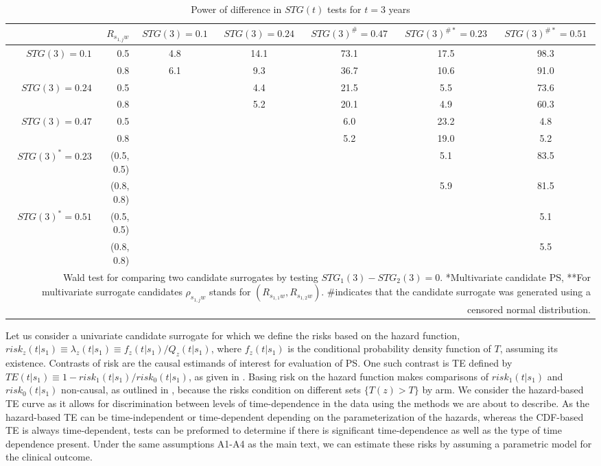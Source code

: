 \documentclass[times, 11pt]{article}
\begin{document}
\begin{table}
\begin{center}
\caption{Power of difference in $STG(t)$ tests for $t=3$ years \label{Power}}
\begin{tabular}{rrccccc}
  \hline
 & $R_{s_{1,j}w}$ & $STG(3)=0.1$  & $STG(3)=0.24$  & $STG(3)^{\#}=0.47$& $STG(3)^{\#*}=0.23$  & $STG(3)^{\#*}=0.51$\\
  \hline
$STG(3)=0.1$ &0.5 & 4.8 & 14.1 & 73.1 & 17.5 & 98.3 \\ 
   &0.8 &6.1 & 9.3 & 36.7 & 10.6 & 91.0 \\ 
$STG(3)=0.24$ &0.5&  & 4.4 & 21.5 & 5.5 & 73.6 \\ 
   &0.8 &  & 5.2 & 20.1 & 4.9 & 60.3 \\ 
$STG(3)=0.47$&0.5 &  &  & 6.0 & 23.2 & 4.8 \\ 
   &0.8&  &  & 5.2 & 19.0 & 5.2 \\ 
$STG(3)^{*}=0.23$&(0.5, 0.5) &  &  &  & 5.1 & 83.5 \\ 
   &(0.8, 0.8) &  &  &  & 5.9 & 81.5 \\ 
$STG(3)^{*}=0.51$&(0.5, 0.5)&   &  &  &  & 5.1 \\ 
   &(0.8, 0.8)&  &  &  &  & 5.5 \\ 
   \hline
\multicolumn{7}{p{9in}}{Wald test for comparing two candidate surrogates by testing $STG_1(3)-STG_2(3)=0$. *Multivariate candidate PS, **For multivariate surrogate candidates $\rho_{s_{1,j}w}$ stands for $(R_{s_{1,1}w},R_{s_{1,2}w})$. \#indicates that the candidate surrogate was generated using a censored normal distribution.}
\end{tabular}
\end{center}
\end{table}

Let us consider a univariate candidate surrogate for which we define the risks based on the hazard function, $risk_{z}(t|s_1)\equiv\lambda_z(t|s_1)\equiv{f_z(t|s_1)/Q_z(t|s_1)}$, where $f_z(t|s_1)$ is the conditional probability density function of $T$, assuming its existence. Contrasts of risk are the causal estimands of interest for evaluation of PS. One such contrast is TE defined by $TE(t|s_1) \equiv 1 - {risk_1(t|s_1) / risk_0(t|s_1)}$, as given in \citet{Gabriel13}. Basing risk on the hazard function makes comparisons of $risk_{1}(t|s_1)$ and $risk_{0}(t|s_1)$ non-causal, as outlined in \citet{Hernan10}, because the risks condition on different sets $\{T(z)>T\}$ by arm. We consider the hazard-based TE curve as it allows for discrimination between levels of time-dependence in the data using the methods we are about to describe. As the hazard-based TE can be time-independent or time-dependent depending on the parameterization of the hazards, whereas the CDF-based TE is always time-dependent, tests can be preformed to determine if there is significant time-dependence as well as the type of time dependence present. Under the same assumptions A1-A4 as the main text, we can estimate these risks by assuming a parametric model for the clinical outcome.
\end{document}
